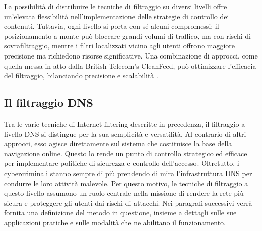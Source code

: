 La possibilità di distribuire le tecniche di filtraggio su diversi livelli offre un'elevata flessibilità nell'implementazione delle strategie di controllo dei contenuti. Tuttavia, ogni livello si porta con sé alcuni compromessi: il posizionamento a monte può bloccare grandi volumi di traffico, ma con rischi di sovrafiltraggio, mentre i filtri localizzati vicino agli utenti offrono maggiore precisione ma richiedono risorse significative. Una combinazione di approcci, come quella messa in atto dalla British Telecom’s CleanFeed, può ottimizzare l'efficacia del filtraggio, bilanciando precisione e scalabilità \cite{Varadharajan2010}.

\subsection{Il filtraggio DNS}
Tra le varie tecniche di Internet filtering descritte in precedenza, il filtraggio a livello DNS si distingue per la sua semplicità e versatilità. Al contrario di altri approcci, esso agisce direttamente sul sistema che costituisce la base della navigazione online. Questo lo rende un punto di controllo strategico ed efficace per implementare politiche di sicurezza e controllo dell'accesso. Oltretutto, i cybercriminali stanno sempre di più prendendo di mira l'infrastruttura DNS per condurre le loro attività malevole. Per questo motivo, le tecniche di filtraggio a questo livello assumono un ruolo centrale nella missione di rendere la rete più sicura e proteggere gli utenti dai rischi di attacchi. Nei paragrafi successivi verrà fornita una definizione del metodo in questione, insieme a dettagli sulle sue applicazioni pratiche e sulle modalità che ne abilitano il funzionamento.

